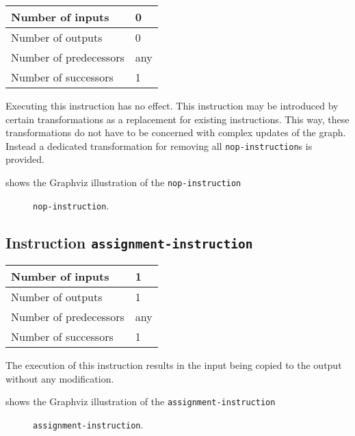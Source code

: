 \begin{tabular}{|l|l|}
\hline
Number of inputs & 0\\
\hline
Number of outputs & 0\\
\hline
Number of predecessors & any\\
\hline
Number of successors & 1\\
\hline
\end{tabular}

Executing this instruction has no effect.  This instruction may be
introduced by certain transformations as a replacement for existing
instructions.  This way, these transformations do not have to be
concerned with complex updates of the graph.  Instead a dedicated
transformation for removing all \texttt{nop-instruction}s is provided.

 shows the Graphviz illustration of the
\texttt{nop-instruction}

\begin{figure}
\begin{center}
\end{center}
\caption{\label{fig-nop-instruction}
\texttt{nop-instruction}.}
\end{figure}

\subsection{Instruction \texttt{assignment-instruction}}
\label{mir-instruction-assignment}

\begin{tabular}{|l|l|}
\hline
Number of inputs & 1\\
\hline
Number of outputs & 1\\
\hline
Number of predecessors & any\\
\hline
Number of successors & 1\\
\hline
\end{tabular}

The execution of this instruction results in the input being copied to
the output without any modification. 

 shows the Graphviz illustration of the
\texttt{assignment-instruction}

\begin{figure}
\begin{center}
\end{center}
\caption{\label{fig-assignment-instruction}
\texttt{assignment-instruction}.}
\end{figure}

